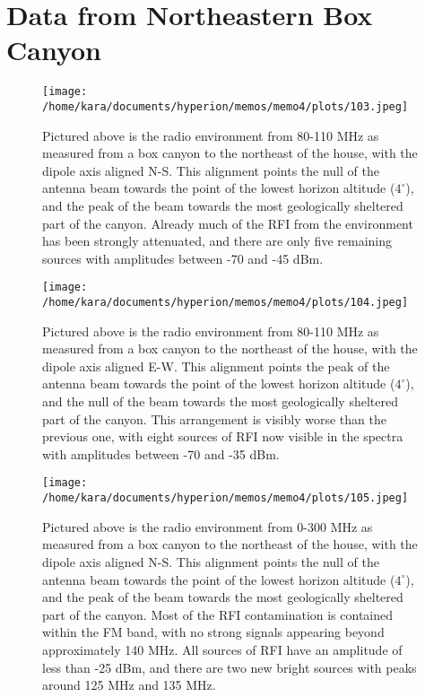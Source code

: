 \documentclass[11pt]{article}
\begin{document}
\section{Data from Northeastern Box Canyon}

\begin{figure}[H]
 \begin{center}
 \texttt{[image: /home/kara/documents/hyperion/memos/memo4/plots/103.jpeg]}
 \end{center}
 \caption{
        Pictured above is the radio environment from 80-110 MHz as measured 
        from a box canyon to the northeast of the house, with the dipole axis 
        aligned N-S. This alignment points the null of the antenna beam towards 
        the point of the lowest horizon altitude ($4^{\circ}$), and the peak of 
        the beam towards the most geologically sheltered part of the canyon.  
        Already much of the RFI from the environment has been strongly 
        attenuated, and there are only five remaining sources with amplitudes 
        between -70 and -45 dBm.
 }
\end{figure}

\begin{figure}[H]
 \begin{center}
 \texttt{[image: /home/kara/documents/hyperion/memos/memo4/plots/104.jpeg]}
 \end{center}
 \caption{
        Pictured above is the radio environment from 80-110 MHz as measured 
        from a box canyon to the northeast of the house, with the dipole axis 
        aligned E-W. This alignment points the peak of the antenna beam towards 
        the point of the lowest horizon altitude ($4^{\circ}$), and the null of 
        the beam towards the most geologically sheltered part of the canyon.  
        This arrangement is visibly worse than the previous one, with eight 
        sources of RFI now visible in the spectra with amplitudes between -70 
        and -35 dBm.
 }
\end{figure}

\begin{figure}[H]
 \begin{center}
 \texttt{[image: /home/kara/documents/hyperion/memos/memo4/plots/105.jpeg]}
 \end{center}
 \caption{
        Pictured above is the radio environment from 0-300 MHz as measured from 
        a box canyon to the northeast of the house, with the dipole axis 
        aligned N-S. This alignment points the null of the antenna beam towards 
        the point of the lowest horizon altitude ($4^{\circ}$), and the peak of 
        the beam towards the most geologically sheltered part of the canyon.  
        Most of the RFI contamination is contained within the FM band, with no 
        strong signals appearing beyond approximately 140 MHz. All sources of 
        RFI have an amplitude of less than -25 dBm, and there are two new 
        bright sources with peaks around 125 MHz and 135 MHz.
 }
\end{figure}
\end{document}
